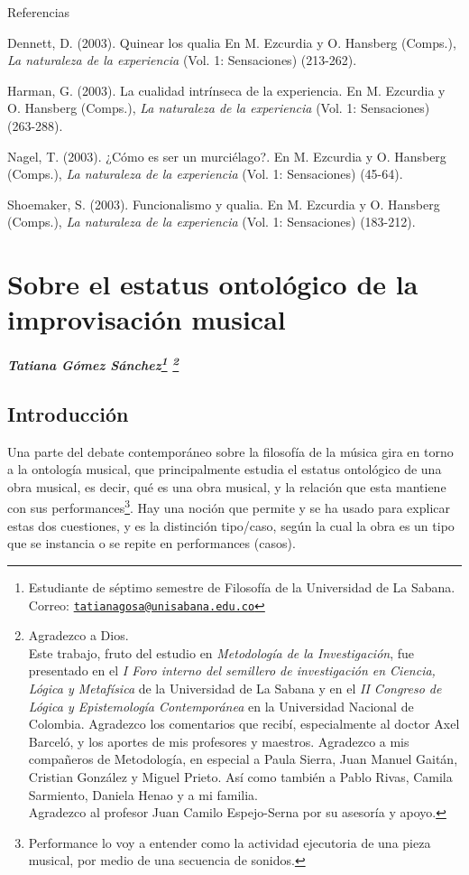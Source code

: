 \documentclass[]{book}
\newcommand{\autor}[1]{            %
  \begin{center}                   %
    \vspace*{-3.5em}               %
    \textbf{\textit{\large #1}}    %
    \vspace*{+4em}                 %
  \end{center}
}
\begin{document}
Referencias

Dennett, D. (2003). Quinear los qualia En M. Ezcurdia y O. Hansberg
(Comps.), \emph{La naturaleza de la experiencia} (Vol. 1: Sensaciones)
(213-262).

Harman, G. (2003). La cualidad intrínseca de la experiencia. En M.
Ezcurdia y O. Hansberg (Comps.), \emph{La naturaleza de la experiencia}
(Vol. 1: Sensaciones) (263-288).

Nagel, T. (2003). ¿Cómo es ser un murciélago?. En M. Ezcurdia y O.
Hansberg (Comps.), \emph{La naturaleza de la experiencia} (Vol. 1:
Sensaciones) (45-64).

Shoemaker, S. (2003). Funcionalismo y qualia. En M. Ezcurdia y O.
Hansberg (Comps.), \emph{La naturaleza de la experiencia} (Vol. 1:
Sensaciones) (183-212).

\chapter{\texorpdfstring{\textbf{Sobre el estatus ontológico de la improvisación musical}}{Sobre el estatus ontológico de la improvisación musical}}\label{sobre-el-estatus-ontológico-de-la-improvisación-musical}

\autor{Tatiana Gómez Sánchez\footnote{Estudiante de séptimo semestre de
		Filosofía de la Universidad de La Sabana. Correo:
		\href{mailto:tatianagosa@unisabana.edu.co}{\nolinkurl{tatianagosa@unisabana.edu.co}}} \footnote{Agradezco a Dios.\\
		Este trabajo, fruto del estudio en \textit{Metodología de la Investigación}, fue presentado en el \textit{I Foro interno del semillero de investigación en Ciencia, Lógica y Metafísica} de la Universidad de La Sabana y en el \textit{II Congreso de Lógica y Epistemología Contemporánea} en la Universidad Nacional de Colombia. Agradezco los comentarios que recibí, especialmente al doctor Axel Barceló, y los aportes de mis profesores y maestros. Agradezco a mis compañeros de Metodología, en especial a Paula Sierra, Juan Manuel Gaitán, Cristian González y Miguel Prieto. Así como también a Pablo Rivas, Camila Sarmiento, Daniela Henao y a mi familia.\\
		Agradezco al profesor Juan Camilo Espejo-Serna por su asesoría y apoyo.}}

\section*{Introducción}

Una parte del debate contemporáneo sobre la filosofía de la música gira
en torno a la ontología musical, que principalmente estudia el estatus
ontológico de una obra musical, es decir, qué es una obra musical, y la
relación que esta mantiene con sus performances\footnote{Performance lo
  voy a entender como la actividad ejecutoria de una pieza musical, por
  medio de una secuencia de sonidos.}. Hay una noción que permite y se
ha usado para explicar estas dos cuestiones, y es la distinción
tipo/caso, según la cual la obra es un tipo que se instancia o se repite
en performances (casos).
\end{document}
